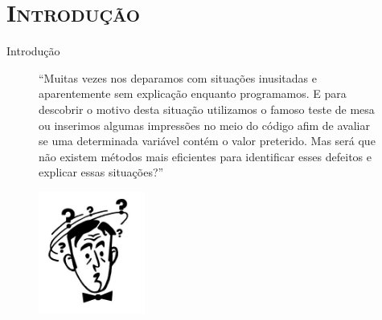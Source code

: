 \section{\scshape Introdução}
\frame{\tableofcontents[
    currentsection,
    currentsubsection,
    subsectionstyle=show/shaded/hide
]}
\begin{frame}{Introdução}


\begin{figure}
\centering
    \begin{minipage}{.6\textwidth}
    \centering
    ``Muitas vezes nos deparamos com situações inusitadas e aparentemente sem explicação enquanto programamos. E para descobrir o motivo desta situação utilizamos o famoso teste de mesa ou inserimos algumas impressões no meio do código afim de avaliar se uma determinada variável contém o valor preterido. Mas será que não existem métodos mais eficientes para identificar esses defeitos e explicar essas situações?''
    \end{minipage}%
    \begin{minipage}{.4\textwidth}
        \centering
        \includegraphics[width=3.5cm]{images/whattuck.png}
      \label{fig:test1}
    \end{minipage}

\end{figure}


    

\end{frame}